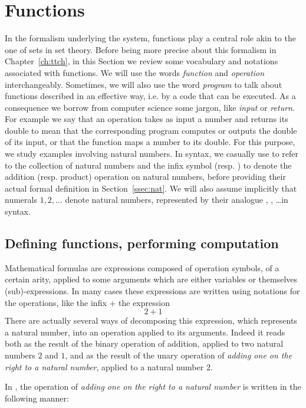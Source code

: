 \section{Functions}\label{sec:functions}
In the formalism underlying the \Coq{} system, functions play a
central role akin to the one of sets in set theory. Before being more
precise about this formalism in Chapter~\ref{ch:ttch}, in this Section
we review some vocabulary and notations associated with functions.
We will use the words \emph{function} and \emph{operation}
interchangeably. Sometimes, we will also use the word \emph{program}
to talk about functions described in an effective way, i.e. by a code
that can be executed. As a consequence we borrow from computer science
some jargon, like \emph{input} or \emph{return}. For example we say that
an operation takes as input a number and returns its double to mean
that the corresponding program computes or outputs the double of its
input, or that the function maps a number to its double. For
this purpose, we study examples involving natural numbers. In \Coq{}
syntax, we casually use  to refer to the collection of natural
numbers and the infix symbol  \C{+} (resp. \C{*}) to denote the  addition
(resp. product) operation on natural numbers,  before providing their
actual formal definition in Section~\ref{ssec:nat}. We will also
assume implicitly that numerals $1, 2, \dots$ denote natural numbers,
represented by their analogue , , \dots in \Coq{} syntax.


\subsection{Defining functions, performing computation}\label{ssec:deffun}
Mathematical formulas are expressions composed of operation symbols,
of a certain arity, applied to some arguments which are
either variables or themselves (sub)-expressions.
In many cases these
expressions are written using notations for the operations, like the
infix $+$ the expression
\[ 2 + 1 \]
There are actually several ways of decomposing this expression, which
represents a natural number, into an operation applied to its arguments.
Indeed it reads both as  the result of the binary operation
of addition, applied to two natural numbers $2$ and $1$, and as the
result of the unary operation of {\em adding one on the right to a
  natural number}, applied to a natural number $2$.

In \Coq{}, the operation of {\em adding one on the right to a natural number} is
written in the following manner:

